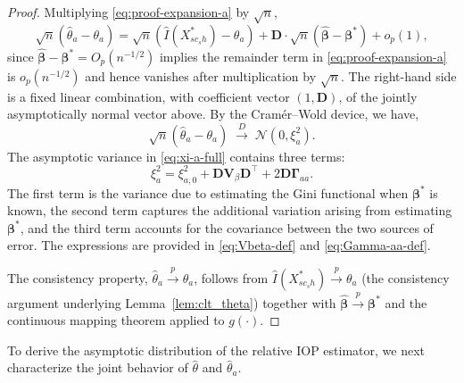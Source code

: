 \documentclass[12pt]{article}
\theoremstyle{plain}
\theoremstyle{definition}
\begin{document}
\begin{proof}
Multiplying \eqref{eq:proof-expansion-a} by $\sqrt n$,
\[
\sqrt n\left(\hat\theta_a-\theta_a\right)
= \sqrt n\left(\hat I(X^*_{sc_sh})-\theta_a\right)
+ \mathbf D\cdot\sqrt n\left(\hat{\boldsymbol\beta}-\boldsymbol\beta^*\right)
+ o_p(1),
\]
since $\hat{\boldsymbol\beta}-\boldsymbol\beta^*=O_p(n^{-1/2})$ implies the remainder term in
\eqref{eq:proof-expansion-a} is $o_p(n^{-1/2})$ and hence vanishes after multiplication by
$\sqrt n$. The right-hand side is a fixed linear combination, with coefficient vector
$(1,\mathbf D)$, of the jointly asymptotically normal vector above. By the Cramér--Wold device, we have,
\begin{equation}
\sqrt n\left(\hat\theta_a-\theta_a\right)\;\xrightarrow{D}\;\mathcal N(0,\xi_a^2).
\label{eq:xi-a-full}
\end{equation}
The asymptotic variance in \eqref{eq:xi-a-full} contains three terms:
\[
\xi_a^2
=
\xi_{a,0}^2
+
\mathbf D\mathbf V_\beta\mathbf D^\top
+
2\mathbf D\boldsymbol\Gamma_{aa}.
\]
The first term is the variance due to estimating the Gini functional when $\boldsymbol\beta^*$ is known, the second term captures the additional variation arising
from estimating $\boldsymbol\beta^*$, and the third term accounts for the covariance
between the two sources of error. The expressions are provided in \eqref{eq:Vbeta-def} and \eqref{eq:Gamma-aa-def}.

The consistency property, $\hat\theta_a\xrightarrow{p}\theta_a$, follows from
$\hat I(X^*_{sc_sh})\xrightarrow{p}\theta_a$ (the consistency argument underlying
Lemma~\ref{lem:clt_theta}) together with $\hat{\boldsymbol\beta}\xrightarrow{p}\boldsymbol\beta^*$
and the continuous mapping theorem applied to $g(\cdot)$.
\end{proof}
To derive the asymptotic distribution of the relative IOP estimator, we next characterize the joint behavior of $\hat{\theta}$ and $\hat{\theta}_a$.
\end{document}
